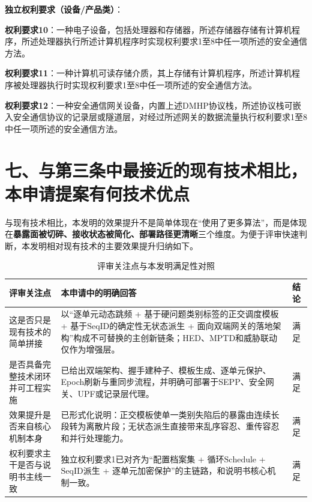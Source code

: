 ﻿\documentclass[12pt,a4paper]{article}
\begin{document}
\textbf{独立权利要求（设备/产品类）}：

\textbf{权利要求10}：一种电子设备，包括处理器和存储器，所述存储器存储有计算机程序，所述处理器执行所述计算机程序时实现权利要求1至8中任一项所述的安全通信方法。

\textbf{权利要求11}：一种计算机可读存储介质，其上存储有计算机程序，所述计算机程序被处理器执行时实现权利要求1至8中任一项所述的安全通信方法。

\textbf{权利要求12}：一种安全通信网关设备，内置上述DMHP协议栈，所述协议栈可嵌入安全通信协议的记录层或隧道层，对经过所述网关的数据流量执行权利要求1至8中任一项所述的安全通信方法。

\section*{七、与第三条中最接近的现有技术相比，本申请提案有何技术优点}

与现有技术相比，本发明的效果提升不是简单体现在“使用了更多算法”，而是体现在\textbf{暴露面被切碎、接收状态被简化、部署路径更清晰}三个维度。为便于评审快速判断，本发明相对现有技术的主要效果提升归纳如下。

\begin{table}[H]
\centering
\begin{tabular}{|p{3.8cm}|p{8.4cm}|p{1.6cm}|}
\hline
\textbf{评审关注点} & \textbf{本申请中的明确回答} & \textbf{结论} \\ \hline
这是否只是现有技术的简单拼接 & 以“逐单元动态跳频 + 基于硬问题类别标签的正交调度模板 + 基于$\text{SeqID}$的确定性无状态派生 + 面向双端网关的落地架构”构成不可替换的主创新链条；HED、MPTD和威胁联动仅作为增强层。 & 满足 \\ \hline
是否具备完整技术闭环并可工程实施 & 已给出双端架构、握手建种子、模板生成、逐单元保护、Epoch刷新与重同步流程，并明确可部署于SEPP、安全网关、UPF或记录层代理。 & 满足 \\ \hline
效果提升是否来自核心机制本身 & 已形式化说明：正交模板使单一类别失陷后的暴露由连续长段转为离散片段；无状态派生直接带来乱序容忍、重传容忍和并行处理能力。 & 满足 \\ \hline
权利要求主干是否与说明书主线一致 & 独立权利要求1已对齐为“配置档案集 + 循环$\text{Schedule}$ + $\text{SeqID}$派生 + 逐单元加密保护”的主链路，和说明书核心机制一致。 & 满足 \\ \hline
\end{tabular}
\caption{评审关注点与本发明满足性对照}
\end{table}
\end{document}
